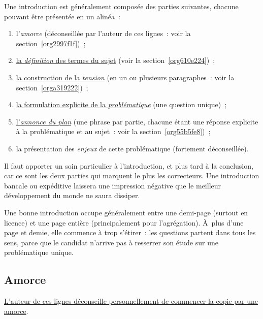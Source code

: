 \documentclass[a4paper,12pt]{article}
\begin{document}
Une introduction est généralement composée des parties suivantes,
chacune pouvant être présentée en un alinéa :

\begin{enumerate}
\item l'\emph{amorce} (déconseillée par l'auteur de ces lignes : voir la
section \ref{org2997f1f}) ;

\item \uline{la \emph{définition} des termes du sujet} (voir la section \ref{org610e224}) ;

\item \uline{la construction de la \emph{tension}} (en un ou plusieurs paragraphes :
voir la section \ref{orga319222}) ;

\item \uline{la formulation explicite de la \emph{problématique}} (une question
unique) ;

\item \uline{l'\emph{annonce du plan}} (une phrase par partie, chacune étant une
réponse explicite à la problématique et au sujet : voir la
section \ref{org55b5fe8}) ;

\item la présentation des \emph{enjeux} de cette problématique (fortement
déconseillée).
\end{enumerate}

Il faut apporter un soin particulier à l'introduction, et plus tard à la
conclusion, car ce sont les deux parties qui marquent le plus les
correcteurs. Une introduction bancale ou expéditive laissera une
impression négative que le meilleur développement du monde ne saura
dissiper.

Une bonne introduction occupe généralement entre une demi-page (surtout
en licence) et une page entière (principalement pour l'agrégation).
À plus d'une page et demie, elle commence à trop s'étirer : les
questions partent dans tous les sens, parce que le candidat n'arrive pas
à resserrer son étude sur une problématique unique.

\subsection{Amorce}
\label{sec:orgfecf41c}
\label{org2997f1f}

\uline{L'auteur de ces lignes déconseille personnellement de commencer la
copie par une amorce}.
\end{document}
